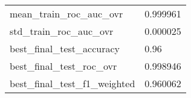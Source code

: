 \begin{tabular}{ll}
mean\_train\_roc\_auc\_ovr      &                                           0.999961 \\
std\_train\_roc\_auc\_ovr       &                                           0.000025 \\
best\_final\_test\_accuracy    &                                               0.96 \\
best\_final\_test\_roc\_ovr     &                                           0.998946 \\
best\_final\_test\_f1\_weighted &                                           0.960062 \\
\bottomrule
\end{tabular}

